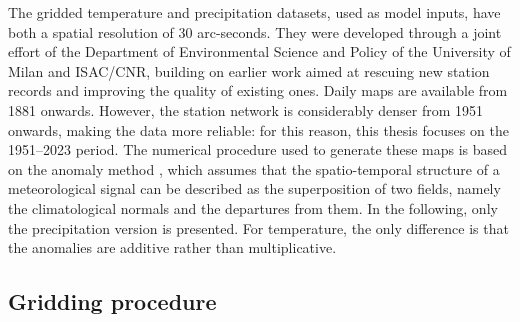 The gridded temperature and precipitation datasets, used as model inputs, have both a spatial resolution of \num{30} arc-seconds. They were developed 
through a joint effort of the Department of Environmental Science and Policy of the University of Milan and ISAC/CNR, building on earlier work 
aimed at rescuing new station records and improving the quality of existing ones. Daily maps are available from 1881 onwards. However, the station 
network is considerably denser from 1951 onwards, making the data more reliable: for this reason, this thesis focuses on the 1951--2023 period. The numerical 
procedure used to generate these maps is based on the anomaly method \parencite{precipitation_IHGAR}, which assumes that the spatio-temporal structure 
of a meteorological signal can be described as the superposition of two fields, namely the climatological normals and the departures from them. In the 
following, only the precipitation version is presented. For temperature, the only difference is that the anomalies are additive rather than multiplicative.



\subsection{Gridding procedure}

